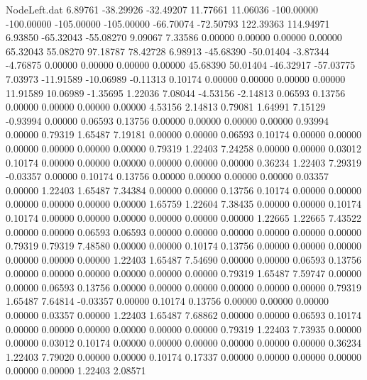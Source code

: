 \begin{filecontents}{NodeLeft.dat}
   6.89761  -38.29926  -32.49207    11.77661   11.06036 -100.00000 -100.00000 -105.00000 -105.00000  -66.70074  -72.50793  122.39363  114.94971
   6.93850  -65.32043  -55.08270     9.09067    7.33586    0.00000    0.00000    0.00000    0.00000   65.32043   55.08270   97.18787   78.42728
   6.98913  -45.68390  -50.01404    -3.87344   -4.76875    0.00000    0.00000    0.00000    0.00000   45.68390   50.01404  -46.32917  -57.03775
   7.03973  -11.91589  -10.06989    -0.11313    0.10174    0.00000    0.00000    0.00000    0.00000   11.91589   10.06989   -1.35695    1.22036
   7.08044   -4.53156   -2.14813     0.06593    0.13756    0.00000    0.00000    0.00000    0.00000    4.53156    2.14813    0.79081    1.64991
   7.15129   -0.93994    0.00000     0.06593    0.13756    0.00000    0.00000    0.00000    0.00000    0.93994    0.00000    0.79319    1.65487
   7.19181    0.00000    0.00000     0.06593    0.10174    0.00000    0.00000    0.00000    0.00000    0.00000    0.00000    0.79319    1.22403
   7.24258    0.00000    0.00000     0.03012    0.10174    0.00000    0.00000    0.00000    0.00000    0.00000    0.00000    0.36234    1.22403
   7.29319   -0.03357    0.00000     0.10174    0.13756    0.00000    0.00000    0.00000    0.00000    0.03357    0.00000    1.22403    1.65487
   7.34384    0.00000    0.00000     0.13756    0.10174    0.00000    0.00000    0.00000    0.00000    0.00000    0.00000    1.65759    1.22604
   7.38435    0.00000    0.00000     0.10174    0.10174    0.00000    0.00000    0.00000    0.00000    0.00000    0.00000    1.22665    1.22665
   7.43522    0.00000    0.00000     0.06593    0.06593    0.00000    0.00000    0.00000    0.00000    0.00000    0.00000    0.79319    0.79319
   7.48580    0.00000    0.00000     0.10174    0.13756    0.00000    0.00000    0.00000    0.00000    0.00000    0.00000    1.22403    1.65487
   7.54690    0.00000    0.00000     0.06593    0.13756    0.00000    0.00000    0.00000    0.00000    0.00000    0.00000    0.79319    1.65487
   7.59747    0.00000    0.00000     0.06593    0.13756    0.00000    0.00000    0.00000    0.00000    0.00000    0.00000    0.79319    1.65487
   7.64814   -0.03357    0.00000     0.10174    0.13756    0.00000    0.00000    0.00000    0.00000    0.03357    0.00000    1.22403    1.65487
   7.68862    0.00000    0.00000     0.06593    0.10174    0.00000    0.00000    0.00000    0.00000    0.00000    0.00000    0.79319    1.22403
   7.73935    0.00000    0.00000     0.03012    0.10174    0.00000    0.00000    0.00000    0.00000    0.00000    0.00000    0.36234    1.22403
   7.79020    0.00000    0.00000     0.10174    0.17337    0.00000    0.00000    0.00000    0.00000    0.00000    0.00000    1.22403    2.08571

\end{filecontents}
